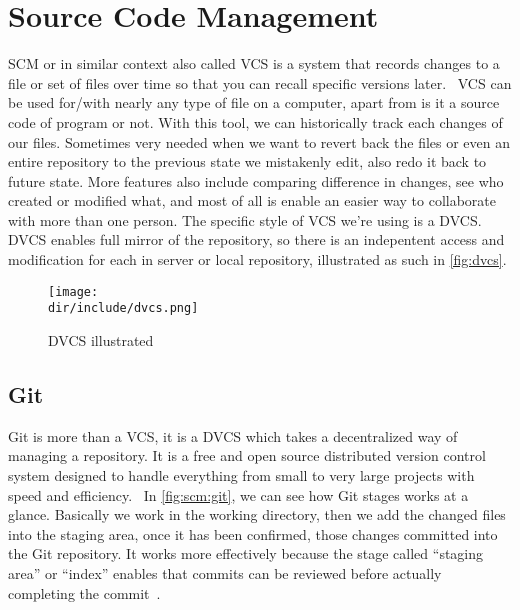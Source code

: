 \section{Source Code Management}
\label{sec:scm}

\ac{SCM} or in similar context also called \ac{VCS} is a system that records changes to a file or set of files over time so that you can recall specific versions later.~\autocite{Chacon:2014:ProGit:27}
\ac{VCS} can be used for/with nearly any type of file on a computer, apart from is it a source code of program or not.
With this tool, we can historically track each changes of our files.
Sometimes very needed when we want to revert back the files or even an entire repository to the previous state we mistakenly edit, also redo it back to future state.
More features also include comparing difference in changes, see who created or modified what, and most of all is enable an easier way to collaborate with more than one person.
The specific style of \ac{VCS} we're using is a \ac{DVCS}.
\ac{DVCS} enables full mirror of the repository, so there is an indepentent access and modification for each in server or local repository, illustrated as such in \autoref{fig:dvcs}.

\begin{figure}[htb]
    \centering
    \texttt{[image: \\dir/include/dvcs.png]}
    \caption[DVCS illustrated]{DVCS illustrated}
    \label{fig:dvcs}
\end{figure}

\subsection{Git}

Git is more than a \ac{VCS}, it is a \ac{DVCS} which takes a decentralized way of managing a repository.
It is a free and open source distributed version control system designed to handle everything from small to very large projects with speed and efficiency.~\autocite{Git2010}
In \autoref{fig:scm:git}, we can see how Git stages works at a glance.
Basically we work in the working directory, then we add the changed files into the staging area, once it has been confirmed, those changes committed into the Git repository.
It works more effectively because the stage called ``staging area'' or ``index'' enables that commits can be reviewed before actually completing the commit~\autocite{Git2010}.

